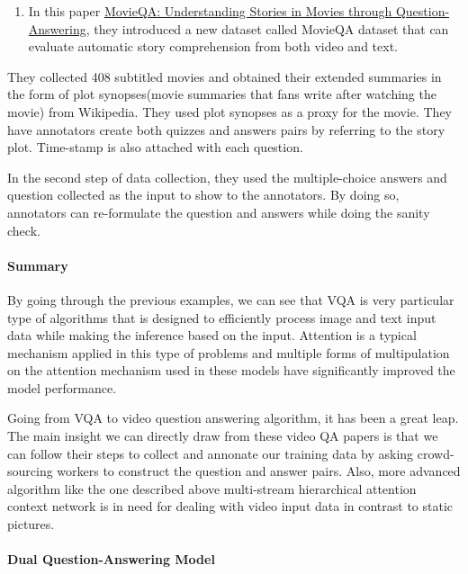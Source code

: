 \documentclass[]{book}
\providecommand{\tightlist}{%
  \setlength{\itemsep}{0pt}\setlength{\parskip}{0pt}}
\let\oldparagraph\paragraph
\renewcommand{\paragraph}[1]{\oldparagraph{#1}\mbox{}}
\theoremstyle{definition}
\theoremstyle{definition}
\theoremstyle{definition}
\theoremstyle{remark}
\begin{document}
\begin{enumerate}
\def\labelenumi{\arabic{enumi}.}
\setcounter{enumi}{1}
\tightlist
\item
  In this paper \href{https://arxiv.org/pdf/1512.02902.pdf}{MovieQA:
  Understanding Stories in Movies through Question-Answering}, they
  introduced a new dataset called MovieQA dataset that can evaluate
  automatic story comprehension from both video and text.
\end{enumerate}

They collected 408 subtitled movies and obtained their extended
summaries in the form of plot synopses(movie summaries that fans write
after watching the movie) from Wikipedia. They used plot synopses as a
proxy for the movie. They have annotators create both quizzes and
answers pairs by referring to the story plot. Time-stamp is also
attached with each question.

In the second step of data collection, they used the multiple-choice
answers and question collected as the input to show to the annotators.
By doing so, annotators can re-formulate the question and answers while
doing the sanity check.

\paragraph{Summary}\label{summary-1}

By going through the previous examples, we can see that VQA is very
particular type of algorithms that is designed to efficiently process
image and text input data while making the inference based on the input.
Attention is a typical mechanism applied in this type of problems and
multiple forms of multipulation on the attention mechanism used in these
models have significantly improved the model performance.

Going from VQA to video question answering algorithm, it has been a
great leap. The main insight we can directly draw from these video QA
papers is that we can follow their steps to collect and annonate our
training data by asking crowd-sourcing workers to construct the question
and answer pairs. Also, more advanced algorithm like the one described
above multi-stream hierarchical attention context network is in need for
dealing with video input data in contrast to static pictures.

\paragraph{Dual Question-Answering
Model}\label{dual-question-answering-model}
\end{document}
